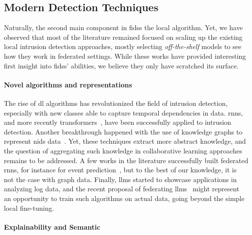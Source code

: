 \subsection{Modern Detection Techniques\label{sec:conclusion.perspectives.detection}}

Naturally, the second main component in \glspl{fids} the local algorithm.
Yet, we have observed that most of the literature remained focused on scaling up the existing local intrusion detection approaches, mostly selecting \emph{off-the-shelf} models to see how they work in federated settings.
While these works have provided interesting first insight into \glspl{fids}' abilities, we believe they only have scratched its surface.


\paragraph{Novel algorithms and representations}

The rise of \gls{dl} algorithms has revolutionized the field of intrusion detection, especially with new classes able to capture temporal dependencies in data.
\Glspl{rnn}, and more recently transformers~\cite{wu_RTIDSRobustTransformerBased_2022}, have been successfully applied to intrusion detection.
Another breakthrough happened with the use of knowledge graphs to represent \gls{nids} data~\cite{leichtnam_Sec2graphNetworkAttack_2020}.
Yet, these techniques extract more abstract knowledge, and the question of aggregating such knowledge in collaborative learning approaches remains to be addressed.
A few works in the literature successfully built federated \glspl{rnn}, for instance for event prediction~\cite{naseri_CerberusExploringFederated_2022}, but to the best of our knowledge, it is not the case with graph data.
Finally, \glspl{llm} started to showcase applications in analyzing log data, and the recent proposal of federating \glspl{llm}~\cite{wu_RTIDSRobustTransformerBased_2022} might represent an opportunity to train such algorithms on actual data, going beyond the simple local fine-tuning.


\paragraph{Explainability and Semantic}

